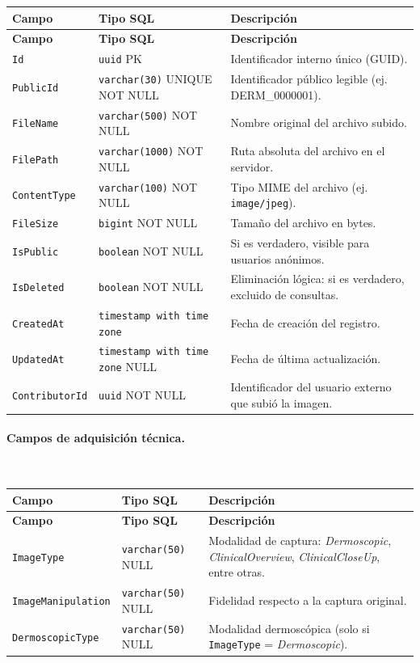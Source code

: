 \begin{longtable}{|p{3.5cm}|p{4cm}|p{7cm}|}
\hline
\textbf{Campo} & \textbf{Tipo SQL} & \textbf{Descripción} \\
\hline
\endfirsthead
\hline
\textbf{Campo} & \textbf{Tipo SQL} & \textbf{Descripción} \\
\hline
\endhead
\texttt{Id} & \texttt{uuid} PK & Identificador interno único (GUID). \\
\hline
\texttt{PublicId} & \texttt{varchar(30)} UNIQUE NOT NULL & Identificador público legible (ej. DERM\_0000001). \\
\hline
\texttt{FileName} & \texttt{varchar(500)} NOT NULL & Nombre original del archivo subido. \\
\hline
\texttt{FilePath} & \texttt{varchar(1000)} NOT NULL & Ruta absoluta del archivo en el servidor. \\
\hline
\texttt{ContentType} & \texttt{varchar(100)} NOT NULL & Tipo MIME del archivo (ej. \texttt{image/jpeg}). \\
\hline
\texttt{FileSize} & \texttt{bigint} NOT NULL & Tamaño del archivo en bytes. \\
\hline
\texttt{IsPublic} & \texttt{boolean} NOT NULL & Si es verdadero, visible para usuarios anónimos. \\
\hline
\texttt{IsDeleted} & \texttt{boolean} NOT NULL & Eliminación lógica: si es verdadero, excluido de consultas. \\
\hline
\texttt{CreatedAt} & \texttt{timestamp with time zone} & Fecha de creación del registro. \\
\hline
\texttt{UpdatedAt} & \texttt{timestamp with time zone} NULL & Fecha de última actualización. \\
\hline
\texttt{ContributorId} & \texttt{uuid} NOT NULL & Identificador del usuario externo que subió la imagen. \\
\hline
\end{longtable}

\paragraph{Campos de adquisición técnica.}~

\begin{longtable}{|p{3.5cm}|p{4cm}|p{7cm}|}
\hline
\textbf{Campo} & \textbf{Tipo SQL} & \textbf{Descripción} \\
\hline
\endfirsthead
\hline
\textbf{Campo} & \textbf{Tipo SQL} & \textbf{Descripción} \\
\hline
\endhead
\texttt{ImageType} & \texttt{varchar(50)} NULL & Modalidad de captura: \textit{Dermoscopic}, \textit{ClinicalOverview}, \textit{ClinicalCloseUp}, entre otras. \\
\hline
\texttt{ImageManipulation} & \texttt{varchar(50)} NULL & Fidelidad respecto a la captura original. \\
\hline
\texttt{DermoscopicType} & \texttt{varchar(50)} NULL & Modalidad dermoscópica (solo si \texttt{ImageType} = \textit{Dermoscopic}). \\
\hline
\end{longtable}

